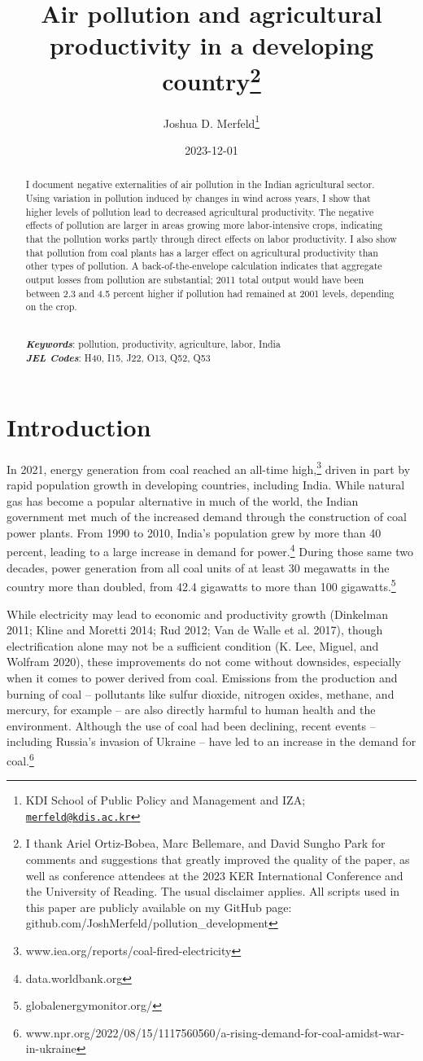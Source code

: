 \documentclass[
]{article}
\title{Air pollution and agricultural productivity in a developing country\footnote{I thank Ariel Ortiz-Bobea, Marc Bellemare, and David Sungho Park for comments and suggestions that greatly improved the quality of the paper, as well as conference attendees at the 2023 KER International Conference and the University of Reading. The usual disclaimer applies. All scripts used in this paper are publicly available on my GitHub page: github.com/JoshMerfeld/pollution\_development}}
\author{Joshua D. Merfeld\footnote{KDI School of Public Policy and Management and IZA; \href{mailto:merfeld@kdis.ac.kr}{\nolinkurl{merfeld@kdis.ac.kr}}}}
\date{2023-12-01}
\begin{document}
\maketitle
\begin{abstract}
\noindent I document negative externalities of air pollution in the Indian agricultural sector. Using variation in pollution induced by changes in wind across years, I show that higher levels of pollution lead to decreased agricultural productivity. The negative effects of pollution are larger in areas growing more labor-intensive crops, indicating that the pollution works partly through direct effects on labor productivity. I also show that pollution from coal plants has a larger effect on agricultural productivity than other types of pollution. A back-of-the-envelope calculation indicates that aggregate output losses from pollution are substantial; 2011 total output would have been between 2.3 and 4.5 percent higher if pollution had remained at 2001 levels, depending on the crop.\\
\strut \\
\textbf{\textit{Keywords}}: pollution, productivity, agriculture, labor, India\\
\textbf{\textit{JEL Codes}}: H40, I15, J22, O13, Q52, Q53
\end{abstract}

\newpage
\doublespacing

\hypertarget{introduction}{%
\section{Introduction}\label{introduction}}

In 2021, energy generation from coal reached an all-time high,\footnote{www.iea.org/reports/coal-fired-electricity} driven in part by rapid population growth in developing countries, including India. While natural gas has become a popular alternative in much of the world, the Indian government met much of the increased demand through the construction of coal power plants. From 1990 to 2010, India's population grew by more than 40 percent, leading to a large increase in demand for power.\footnote{data.worldbank.org} During those same two decades, power generation from all coal units of at least 30 megawatts in the country more than doubled, from 42.4 gigawatts to more than 100 gigawatts.\footnote{globalenergymonitor.org/}

While electricity may lead to economic and productivity growth (Dinkelman 2011; Kline and Moretti 2014; Rud 2012; Van de Walle et al. 2017), though electrification alone may not be a sufficient condition (K. Lee, Miguel, and Wolfram 2020), these improvements do not come without downsides, especially when it comes to power derived from coal. Emissions from the production and burning of coal -- pollutants like sulfur dioxide, nitrogen oxides, methane, and mercury, for example -- are also directly harmful to human health and the environment. Although the use of coal had been declining, recent events -- including Russia's invasion of Ukraine -- have led to an increase in the demand for coal.\footnote{www.npr.org/2022/08/15/1117560560/a-rising-demand-for-coal-amidst-war-in-ukraine}
\end{document}
